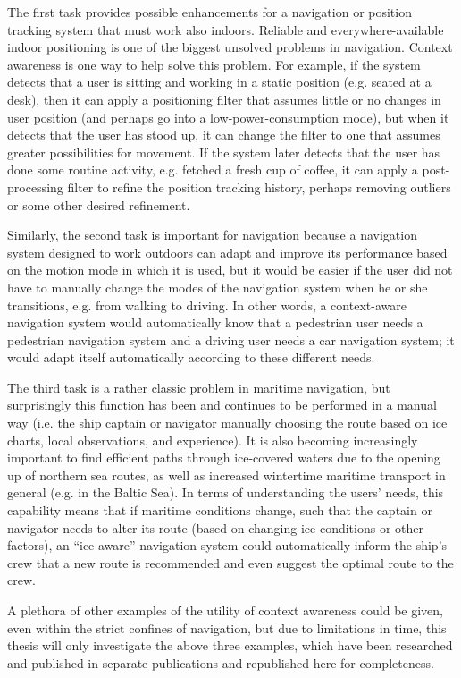 The first task provides possible enhancements for a navigation or position tracking system that must work also indoors. Reliable and everywhere-available indoor positioning is one of the biggest unsolved problems in navigation. Context awareness is one way to help solve this problem. For example, if the system detects that a user is sitting and working in a static position (e.g. seated at a desk), then it can apply a positioning filter that assumes little or no changes in user position (and perhaps go into a low-power-consumption mode), but when it detects that the user has stood up, it can change the filter to one that assumes greater possibilities for movement. If the system later detects that the user has done some routine activity, e.g. fetched a fresh cup of coffee, it can apply a post-processing filter to refine the position tracking history, perhaps removing outliers or some other desired refinement.

Similarly, the second task is important for navigation because a navigation system designed to work outdoors can adapt and improve its performance based on the motion mode in which it is used, but it would be easier if the user did not have to manually change the modes of the navigation system when he or she transitions, e.g. from walking to driving. In other words, a context-aware navigation system would automatically know that a pedestrian user needs a pedestrian navigation system and a driving user needs a car navigation system; it would adapt itself automatically according to these different needs.

The third task is a rather classic problem in maritime navigation, but surprisingly this function has been and continues to be performed in a manual way (i.e. the ship captain or navigator manually choosing the route based on ice charts, local observations, and experience). It is also becoming increasingly important to find efficient paths through ice-covered waters due to the opening up of northern sea routes, as well as increased wintertime maritime transport in general (e.g. in the Baltic Sea). In terms of understanding the users' needs, this capability means that if maritime conditions change, such that the captain or navigator needs to alter its route (based on changing ice conditions or other factors), an ``ice-aware'' navigation system could automatically inform the ship's crew that a new route is recommended and even suggest the optimal route to the crew.

A plethora of other examples of the utility of context awareness could be given, even within the strict confines of navigation, but due to limitations in time, this thesis will only investigate the above three examples, which have been researched and published in separate publications and republished here for completeness.

